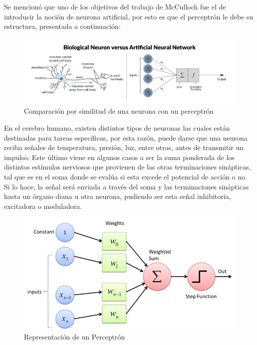 \begin{itemize}
{\begin{enumerate}
\begin{enumerate}
{             Se mencionó que uno de los objetivos del trabajo de McCulloch fue el de introducir la noción de neurona artificial, por esto es que el perceptrón le debe su estructura, presentada a continuación:
             
            \begin{figure}[h!]
                \centering
                \includegraphics[scale=0.5]{Tesis/images/nn}
                \caption{Comparación por similitud de una neurona con un perceptrón}
                \label{fig:NN}
            \end{figure}
            
            En el cerebro humano, existen distintos tipos de neuronas las cuales están destinadas para tareas específicas, por esta razón, puede darse que una neurona reciba señales de temperatura, presión, luz, entre otras, antes de transmitir un impulso. Este último viene en algunos casos a ser la suma ponderada de los distintos estímulos nerviosos que provienen de las otras terminaciones sinápticas, tal que es en el soma donde se evalúa si esta excede el potencial de acción o no. Si lo hace, la señal será enviada a través del soma y las terminaciones sinápticas hasta un órgano diana u otra neurona, pudiendo ser esta señal inhibitoria, excitadora o moduladora.\\
            
            \begin{figure}
                \centering
                \includegraphics[scale=0.35]{Tesis/images/perceptron}
                \caption{Representación de un Perceptrón}
                \label{fig:Perceptron}
            \end{figure}
            
}
\end{enumerate}
\end{enumerate}}
\end{itemize}
